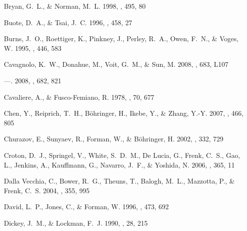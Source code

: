 \documentclass[12pt,preprint]{aastex}
\begin{document}
\begin{thebibliography}{139}
{Bryan}, G.~L., \& {Norman}, M.~L. 1998, \apj, 495, 80

{Buote}, D.~A., \& {Tsai}, J.~C. 1996, \apj, 458, 27

{Burns}, J.~O., {Roettiger}, K., {Pinkney}, J., {Perley}, R.~A., {Owen}, F.~N.,
  \& {Voges}, W. 1995, \apj, 446, 583

{Cavagnolo}, K.~W., {Donahue}, M., {Voit}, G.~M., \& {Sun}, M.
  2008{}, \apjl, 683, L107

---. 2008{}, \apj, 682, 821

{Cavaliere}, A., \& {Fusco-Femiano}, R. 1978, \aap, 70, 677

{Chen}, Y., {Reiprich}, T.~H., {B{\"o}hringer}, H., {Ikebe}, Y., \& {Zhang},
  Y.-Y. 2007, \aap, 466, 805

{Churazov}, E., {Sunyaev}, R., {Forman}, W., \& {B{\"o}hringer}, H. 2002,
  \mnras, 332, 729

{Croton}, D.~J., {Springel}, V., {White}, S.~D.~M., {De Lucia}, G., {Frenk},
  C.~S., {Gao}, L., {Jenkins}, A., {Kauffmann}, G., {Navarro}, J.~F., \&
  {Yoshida}, N. 2006, \mnras, 365, 11

{Dalla Vecchia}, C., {Bower}, R.~G., {Theuns}, T., {Balogh}, M.~L., {Mazzotta},
  P., \& {Frenk}, C.~S. 2004, \mnras, 355, 995

{David}, L.~P., {Jones}, C., \& {Forman}, W. 1996, \apj, 473, 692

{Dickey}, J.~M., \& {Lockman}, F.~J. 1990, \araa, 28, 215


\end{thebibliography}
\end{document}

